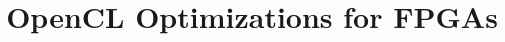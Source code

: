 \documentclass[10pt,numbers]{boilerplate/sigplanconf}
\begin{document}


\title{OpenCL Optimizations for FPGAs}



\maketitle











\end{document}
